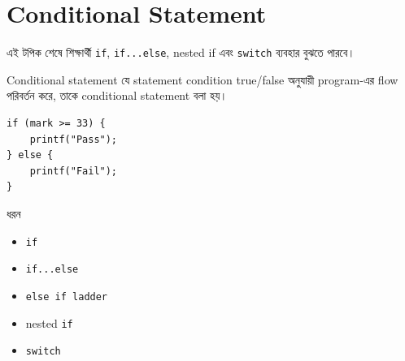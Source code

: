 \section{Conditional Statement}

\begin{learningbox}
এই টপিক শেষে শিক্ষার্থী \texttt{if}, \texttt{if...else}, nested if এবং \texttt{switch} ব্যবহার বুঝতে পারবে।
\end{learningbox}

\begin{definitionbox}{Conditional statement}
যে statement condition true/false অনুযায়ী program-এর flow পরিবর্তন করে, তাকে conditional statement বলা হয়।
\end{definitionbox}

\begin{verbatim}
if (mark >= 33) {
    printf("Pass");
} else {
    printf("Fail");
}
\end{verbatim}

\begin{center}
\end{center}

\begin{keypointbox}{ধরন}
\begin{itemize}
\item \texttt{if}
\item \texttt{if...else}
\item \texttt{else if ladder}
\item nested \texttt{if}
\item \texttt{switch}
\end{itemize}
\end{keypointbox}
